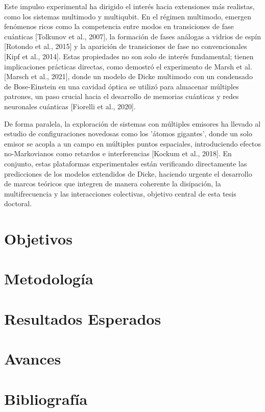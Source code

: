 \documentclass[onecolumn,notitlepage,letterpaper,aps,pra,12pt]{article}
\numberwithin{equation}{section}
\begin{document}
Este impulso experimental ha dirigido el interés hacia extensiones más realistas, como los sistemas multimodo y multiqubit. En el régimen multimodo, emergen fenómenos ricos como la competencia entre modos en transiciones de fase cuánticas [Tolkunov et al., 2007], la formación de fases análogas a vidrios de espín [Rotondo et al., 2015] y la aparición de transiciones de fase no convencionales [Kipf et al., 2014]. Estas propiedades no son solo de interés fundamental; tienen implicaciones prácticas directas, como demostró el experimento de Marsh et al. [Marsch et al., 2021], donde un modelo de Dicke multimodo con un condensado de Bose-Einstein en una cavidad óptica se utilizó para almacenar múltiples patrones, un paso crucial hacia el desarrollo de memorias cuánticas y redes neuronales cuánticas [Fiorelli et al., 2020].

De forma paralela, la exploración de sistemas con múltiples emisores ha llevado al estudio de configuraciones novedosas como los 'átomos gigantes', donde un solo emisor se acopla a un campo en múltiples puntos espaciales, introduciendo efectos no-Markovianos como retardos e interferencias [Kockum et al., 2018]. En conjunto, estas plataformas experimentales están verificando directamente las predicciones de los modelos extendidos de Dicke, haciendo urgente el desarrollo de marcos teóricos que integren de manera coherente la disipación, la multifrecuencia y las interacciones colectivas, objetivo central de esta tesis doctoral.


\section{Objetivos}

\section{Metodología}

\section{Resultados Esperados}

\section{Avances}

\section{Bibliografía}
\end{document}
